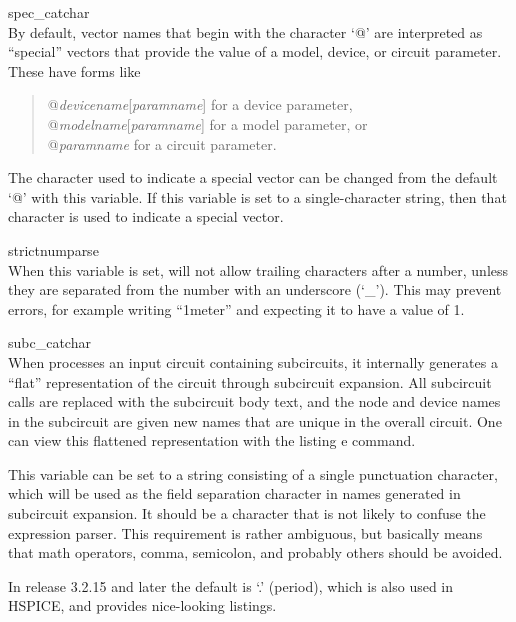 \begin{description}
\item{\et spec\_catchar}\\
By default, vector names that begin with the character `{\vt @}' are
interpreted as ``special'' vectors that provide the value of a model,
device, or circuit parameter.  These have forms like

\begin{quote}
{\vt @}{\it devicename\/}[{\it paramname\/}] for a device parameter,\\
{\vt @}{\it modelname\/}[{\it paramname\/}] for a model parameter, or\\
{\vt @}{\it paramname\/} for a circuit parameter.
\end{quote}

The character used to indicate a special vector can be changed from
the default `{\vt @}' with this variable.  If this variable is set to
a single-character string, then that character is used to indicate a
special vector.

\item{\et strictnumparse}\\
When this variable is set, {\WRspice} will not allow trailing
characters after a number, unless they are separated from the number
with an underscore (`\_').  This may prevent errors, for example
writing ``{\vt 1meter}'' and expecting it to have a value of 1.

\item{\et subc\_catchar}\\
When {\WRspice} processes an input circuit containing subcircuits, it
internally generates a ``flat'' representation of the circuit through
subcircuit expansion.  All subcircuit calls are replaced with the
subcircuit body text, and the node and device names in the subcircuit
are given new names that are unique in the overall circuit.  One can
view this flattened representation with the {\cb listing e} command.

This variable can be set to a string consisting of a single
punctuation character, which will be used as the field separation
character in names generated in subcircuit expansion.  It should be a
character that is not likely to confuse the expression parser.  This
requirement is rather ambiguous, but basically means that math
operators, comma, semicolon, and probably others should be avoided.

In release 3.2.15 and later the default is `{\vt .}' (period), which
is also used in HSPICE, and provides nice-looking listings. 


\end{description}
